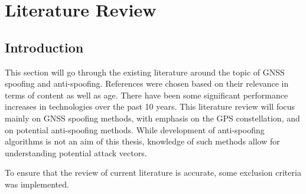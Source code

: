 
\chapter{Literature Review} %

\label{Chapter3} %


\section{Introduction}
This section will go through the existing literature around the topic of GNSS spoofing and anti-spoofing. References were chosen based on their relevance in terms of
content as well as age. There have been some significant performance increases in technologies over the past 10 years.
This literature review will focus mainly on GNSS spoofing methods, with emphasis on the GPS constellation, and on potential anti-spoofing methods. While development of
anti-spoofing algorithms is not an aim of this thesis, knowledge of such methods allow for understanding potential attack vectors.

To ensure that the review of current literature is accurate, some exclusion criteria was implemented.

